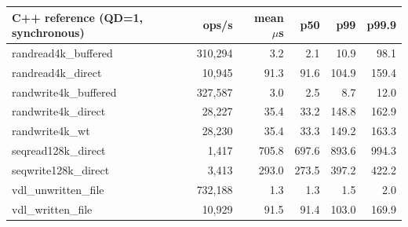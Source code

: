 \begin{tabular}{lrrrrr}
\toprule
C++ reference (QD=1, synchronous) & ops/s & mean $\mu$s & p50 & p99 & p99.9 \\
\midrule
randread4k\_buffered & 310,294 & 3.2 & 2.1 & 10.9 & 98.1 \\
randread4k\_direct & 10,945 & 91.3 & 91.6 & 104.9 & 159.4 \\
randwrite4k\_buffered & 327,587 & 3.0 & 2.5 & 8.7 & 12.0 \\
randwrite4k\_direct & 28,227 & 35.4 & 33.2 & 148.8 & 162.9 \\
randwrite4k\_wt & 28,230 & 35.4 & 33.3 & 149.2 & 163.3 \\
seqread128k\_direct & 1,417 & 705.8 & 697.6 & 893.6 & 994.3 \\
seqwrite128k\_direct & 3,413 & 293.0 & 273.5 & 397.2 & 422.2 \\
vdl\_unwritten\_file & 732,188 & 1.3 & 1.3 & 1.5 & 2.0 \\
vdl\_written\_file & 10,929 & 91.5 & 91.4 & 103.0 & 169.9 \\
\bottomrule
\end{tabular}
